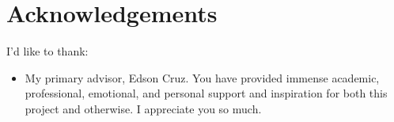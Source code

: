 \documentclass[twoside]{report}
\date{}
\let\oldsection\section
\renewcommand\section{\clearpage\oldsection}
\begin{document}


\pagecolor{white}
\def\contentsname{\empty}
\begin{multicols*}{2}
\tableofcontents
{}
\end{multicols*}


\section{Acknowledgements}

I'd like to thank:

\begin{itemize}
\item
  My primary advisor, Edson Cruz. You have provided
  immense academic, professional, emotional, and personal support and
  inspiration for both this project and otherwise. I appreciate you so much.
\end{itemize}
\end{document}
